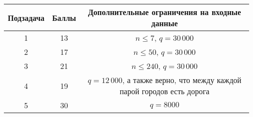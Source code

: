 \begin{center}
\renewcommand{\arraystretch}{1.5}
\begin{tabular}{|c|c|c|}
\hline
Подзадача & Баллы & Дополнительные ограничения на входные данные\\
\hline
1 &  13 & $n \leq 7$, $q = 30\,000$ \\
\hline
2 & 17 &  $n \leq 50$, $q = 30\,000$\\
\hline
3 & 21 & $n \leq 240$, $q = 30\,000$\\
\hline
4 & 19 & $q = 12\,000$, а также верно, что между каждой парой городов есть дорога \\
\hline
5 & 30 & $q = 8000$ \\
\hline
\end{tabular}
\end{center}